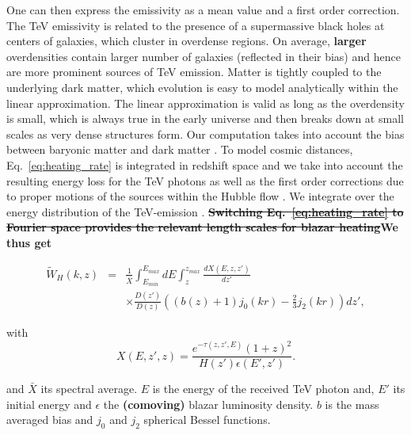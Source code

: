 \documentclass[twocolumns]{emulateapj}
\newcommand\ALc[1]{{\color{red} \bf #1}} %
\newcommand\Pc[1]{{\color{cyan} \bf #1}} %
\begin{document}
 
One can then express the emissivity as a mean value and a first order correction. The TeV emissivity is related to the presence of a supermassive black holes at centers of galaxies, which cluster in overdense regions. On average, \ALc{larger} overdensities contain larger number of galaxies (reflected in their bias) and hence are more prominent sources of TeV emission.  Matter is tightly coupled to the underlying dark matter, which evolution is easy to model analytically within the linear approximation.  The linear approximation is valid as long as the overdensity is small, which is always true in the early universe and then breaks down at small scales as very dense structures form.  Our computation takes into account the bias between baryonic matter and dark matter \citep{1996MNRAS.282..347M}. To model cosmic distances, Eq.~\ref{eq:heating_rate} is integrated in redshift space and we take into account the resulting energy loss for the TeV photons as well as the first order corrections due to proper motions of the sources within the Hubble flow \citep{1987MNRAS.227....1K}. We integrate over the energy distribution of the TeV-emission . \ALc{\sout{Switching Eq.~\ref{eq:heating_rate} to Fourier space provides the relevant length scales for blazar heating}We thus get }

\begin{eqnarray}
  \label{eq:window}
  \tilde{W}_H(k,z)&=&\frac{1}{\bar{X}}\int_{E_{min}}^{E_{max}}dE\int_z^{z_{max}}\frac{dX(E,z,z')}{dz'} \\ 
&&\times \frac{D(z')}{D(z)}\left((b(z)+1)j_0(kr)-\frac{2}{3}j_2(kr)\right)dz', \nonumber
\end{eqnarray}

with 
 \begin{equation}
  \label{eq:define_X}
  X(E,z',z)=\frac{e^{-\tau(z,z',E)}(1+z)^2}{H(z')\epsilon(E',z')}.
\end{equation}

and $\bar{X}$ its spectral average. $E$ is the energy of the received TeV photon and, $E'$ its initial energy and  $\epsilon$ the \ALc{(comoving)} blazar luminosity density. $b$ is the mass averaged bias and $j_0$ and $j_2$ spherical Bessel functions.
\end{document}
